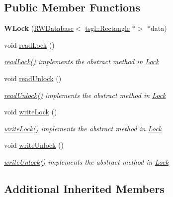 \subsection*{Public Member Functions}
\begin{DoxyCompactItemize}
\item 
\mbox{\label{class_w_lock_a50e6b8271040dee797800e8f74045eef}} 
{\bfseries W\+Lock} (\hyperlink{class_r_w_database}{R\+W\+Database}$<$ \hyperlink{classtsgl_1_1_rectangle}{tsgl\+::\+Rectangle} $\ast$$>$ $\ast$data)
\item 
void \hyperlink{class_w_lock_a9505de4121e181140291ac300885f9ef}{read\+Lock} ()
\begin{DoxyCompactList}\small\item\em \hyperlink{class_w_lock_a9505de4121e181140291ac300885f9ef}{read\+Lock()} implements the abstract method in \hyperlink{class_lock}{Lock} \end{DoxyCompactList}\item 
void \hyperlink{class_w_lock_aaa017b4c3f8c3b8f0e5b43f80b9cad20}{read\+Unlock} ()
\begin{DoxyCompactList}\small\item\em \hyperlink{class_w_lock_aaa017b4c3f8c3b8f0e5b43f80b9cad20}{read\+Unlock()} implements the abstract method in \hyperlink{class_lock}{Lock} \end{DoxyCompactList}\item 
void \hyperlink{class_w_lock_a201118ef4920d6a9333b4bd0b15eddc9}{write\+Lock} ()
\begin{DoxyCompactList}\small\item\em \hyperlink{class_w_lock_a201118ef4920d6a9333b4bd0b15eddc9}{write\+Lock()} implements the abstract method in \hyperlink{class_lock}{Lock} \end{DoxyCompactList}\item 
void \hyperlink{class_w_lock_a7070d23ba439b826e2310d9ffc65006e}{write\+Unlock} ()
\begin{DoxyCompactList}\small\item\em \hyperlink{class_w_lock_a7070d23ba439b826e2310d9ffc65006e}{write\+Unlock()} implements the abstract method in \hyperlink{class_lock}{Lock} \end{DoxyCompactList}\end{DoxyCompactItemize}
\subsection*{Additional Inherited Members}


